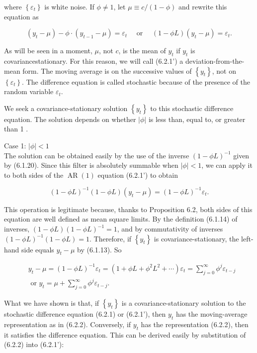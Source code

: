 \documentclass[10pt]{article}
\begin{document}
where $\left\{\varepsilon_{t}\right\}$ is white noise. If $\phi \neq 1$, let $\mu \equiv c /(1-\phi)$ and rewrite this equation as


\begin{equation*}
\left(y_{t}-\mu\right)-\phi \cdot\left(y_{t-1}-\mu\right)=\varepsilon_{t} \quad \text { or } \quad(1-\phi L)\left(y_{t}-\mu\right)=\varepsilon_{t} . \tag{$\prime$}
\end{equation*}


As will be seen in a moment, $\mu$, not $c$, is the mean of $y_{t}$ if $y_{t}$ is covariancestationary. For this reason, we will call (6.2.1') a deviation-from-the-mean form. The moving average is on the successive values of $\left\{y_{t}\right\}$, not on $\left\{\varepsilon_{t}\right\}$. The difference equation is called stochastic because of the presence of the random variable $\varepsilon_{t}$.

We seek a covariance-stationary solution $\left\{y_{t}\right\}$ to this stochastic difference equation. The solution depends on whether $|\phi|$ is less than, equal to, or greater than 1 .

Case 1: $|\phi|<1$\\
The solution can be obtained easily by the use of the inverse $(1-\phi L)^{-1}$ given by (6.1.20). Since this filter is absolutely summable when $|\phi|<1$, we can apply it to both sides of the $\operatorname{AR}(1)$ equation (6.2.1') to obtain

$$
(1-\phi L)^{-1}(1-\phi L)\left(y_{t}-\mu\right)=(1-\phi L)^{-1} \varepsilon_{t} .
$$

This operation is legitimate because, thanks to Proposition 6.2, both sides of this equation are well defined as mean square limits. By the definition (6.1.14) of inverses, $(1-\phi L)(1-\phi L)^{-1}=1$, and by commutativity of inverses $(1-\phi L)^{-1}(1- \phi L)=1$. Therefore, if $\left\{y_{t}\right\}$ is covariance-stationary, the left-hand side equals $y_{t}-\mu$ by (6.1.13). So


\begin{align*}
& y_{t}-\mu=(1-\phi L)^{-1} \varepsilon_{t}=\left(1+\phi L+\phi^{2} L^{2}+\cdots\right) \varepsilon_{t}=\sum_{j=0}^{\infty} \phi^{j} \varepsilon_{t-j} \\
& \text { or } y_{t}=\mu+\sum_{j=0}^{\infty} \phi^{j} \varepsilon_{t-j} . \tag{6.2.2}
\end{align*}


What we have shown is that, if $\left\{y_{t}\right\}$ is a covariance-stationary solution to the stochastic difference equation (6.2.1) or (6.2.1'), then $y_{t}$ has the moving-average representation as in (6.2.2). Conversely, if $y_{t}$ has the representation (6.2.2), then\\
it satisfies the difference equation. This can be derived easily by substitution of (6.2.2) into (6.2.1'):
\end{document}
